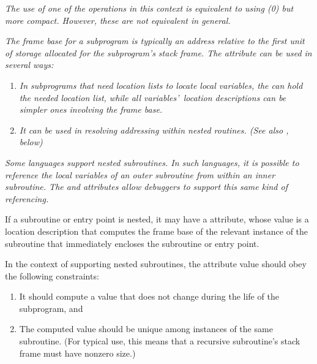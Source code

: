 \textit{The use of one of the \DWOPregn{} 
operations in this
context is equivalent to using 
\DWOPbregn(0) 
but more
compact. However, these are not equivalent in general.}

\textit{The frame base for a subprogram is typically an address
relative to the first unit of storage allocated for the
subprogram\textquoteright s stack frame. The \DWATframebase{} attribute
can be used in several ways:}
\begin{enumerate}[1. ]
\item \textit{In subprograms that need 
location lists to locate local
variables, the \DWATframebase{} can hold the needed location
list, while all variables\textquoteright\  location descriptions can be
simpler ones involving the frame base.}

\item \textit{It can be used in resolving  addressing
within nested routines. 
(See also \DWATstaticlink, below)}
\end{enumerate}

\textit{Some languages support nested subroutines. In such languages,
it is possible to reference the local variables of an
outer subroutine from within an inner subroutine. The
\DWATstaticlink{} and \DWATframebase{} attributes allow
debuggers to support this same kind of referencing.}

If 
\hypertarget{chap:DWATstaticlinklocationofuplevelframe}{}
a 
subroutine or entry point is nested, it may have a
\DWATstaticlink{}
attribute, whose value is a location
description that computes the frame base of the relevant
instance of the subroutine that immediately encloses the
subroutine or entry point.

In the context of supporting nested subroutines, the
\DWATframebase{} attribute value should obey the following
constraints:

\begin{enumerate}[1. ]
\item It should compute a value that does not change during the
life of the subprogram, and

\item The computed value should be unique among instances of
the same subroutine. (For typical \DWATframebase{} use, this
means that a recursive subroutine\textquoteright s stack frame must have
non\dash zero size.)
\end{enumerate}

